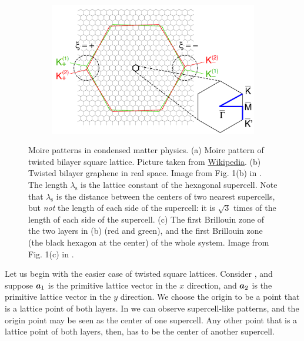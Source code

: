 \documentclass[hyperref, a4paper]{article}
\begin{document}
\begin{figure}
    \begin{subfigure}{0.3\textwidth}
        \centering
        \includegraphics[width=\textwidth]{structure/moire-k-graphene.PNG}
        \subcaption{}
        \label{fig:1bz-1}
    \end{subfigure}
    \caption{Moire patterns in condensed matter physics.
    (a) Moire pattern of twisted bilayer square lattice. 
    Picture taken from \href{https://en.wikipedia.org/wiki/Moir\%C3\%A9\_pattern\#/media/File:Moir\%C3\%A9\_grid.svg}{Wikipedia}.
    (b) Twisted bilayer graphene in real space. Image from Fig. 1(b) in \cite{padhi_doped_2018}.
    The length $\lambda_\text{s}$ is the lattice constant of the hexagonal supercell.
    Note that $\lambda_{\text{s}}$ is the distance between the centers of two nearest supercells,
    but \emph{not} the length of each side of the supercell:
    it is $\sqrt{3}$ times of the length of each side of the supercell.
    (c) The first Brillouin zone of the two layers in (b) (red and green),
    and the first Brillouin zone (the black hexagon at the center) of the whole system.
    Image from Fig. 1(c) in \cite{koshino_band_2019}.
    }
\end{figure}

Let us begin with the easier case of twisted square lattices.
Consider , 
and suppose $\vb*{a}_1$ is the primitive lattice vector in the $x$ direction,
and $\vb*{a}_2$ is the primitive lattice vector in the $y$ direction.
We choose the origin to be a point 
that is a lattice point of both layers.
In  we can observe supercell-like patterns,
and the origin point may be seen as the center of one supercell.
Any other point that is a lattice point of both layers, then,
has to be the center of another supercell.
\end{document}
